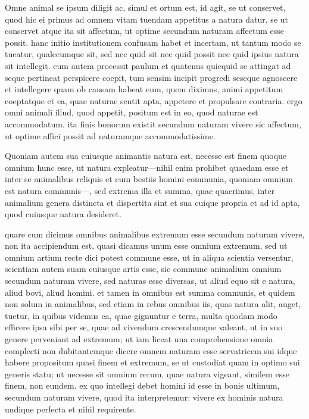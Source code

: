  Omne animal se ipsum diligit ac, simul et ortum est, id agit, se ut conservet, quod hic ei primus ad omnem vitam tuendam appetitus a natura datur, se ut conservet atque ita sit affectum, ut optime secundum naturam affectum esse possit. hanc initio institutionem confusam habet et incertam, ut tantum modo se tueatur, qualecumque sit, sed nec quid sit nec quid possit nec quid ipsius natura sit intellegit. cum autem processit paulum et quatenus quicquid se attingat ad seque pertineat perspicere coepit, tum sensim incipit progredi seseque agnoscere et intellegere quam ob causam habeat eum, quem diximus, animi appetitum coeptatque et ea, quae naturae sentit apta, appetere et propulsare contraria. ergo omni animali illud, quod appetit, positum est in eo, quod naturae est accommodatum. ita finis bonorum existit secundum naturam vivere sic affectum, ut optime affici possit ad naturamque accommodatissime.

 Quoniam autem sua cuiusque animantis natura est, necesse est finem quoque omnium hunc esse, ut natura expleatur—nihil enim prohibet quaedam esse et inter se animalibus reliquis et cum bestiis homini communia, quoniam omnium est natura communis—, sed extrema illa et summa, quae quaerimus, inter animalium genera distincta et dispertita sint et sua cuique propria et ad id apta, quod cuiusque natura desideret.

 quare cum dicimus omnibus animalibus extremum esse secundum naturam vivere, non ita accipiendum est, quasi dicamus unum esse omnium extremum, sed ut omnium artium recte dici potest commune esse, ut in aliqua scientia versentur, scientiam autem suam cuiusque artis esse, sic commune animalium omnium secundum naturam vivere, sed naturas esse diversas, ut aliud equo sit e natura, aliud bovi, aliud homini. et tamen in omnibus est summa communis, et quidem non solum in animalibus, sed etiam in rebus omnibus iis, quas natura alit, auget, tuetur, in quibus videmus ea, quae gignuntur e terra, multa quodam modo efficere ipsa sibi per se, quae ad vivendum crescendumque valeant, ut in suo genere perveniant ad extremum; ut iam liceat una comprehensione omnia complecti non dubitantemque dicere omnem naturam esse servatricem sui idque habere propositum quasi finem et extremum, se ut custodiat quam in optimo sui generis statu; ut necesse sit omnium rerum, quae natura vigeant, similem esse finem, non eundem. ex quo intellegi debet homini id esse in bonis ultimum, secundum naturam vivere, quod ita interpretemur: vivere ex hominis natura undique perfecta et nihil requirente.

